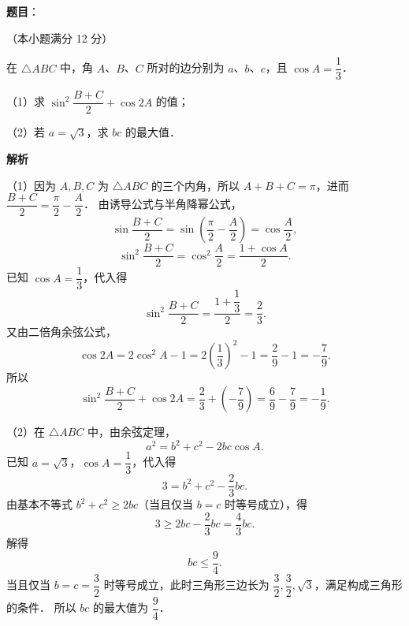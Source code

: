 \begin{answer}

\textbf{题目}：

（本小题满分 12 分）

在 $\triangle ABC$ 中，角 $A$、$B$、$C$ 所对的边分别为 $a$、$b$、$c$，且 $\cos A = \dfrac{1}{3}$．

（1）求 $\sin^2\dfrac{B+C}{2} + \cos 2A$ 的值；

（2）若 $a = \sqrt{3}$，求 $bc$ 的最大值．

\textbf{解析}

（1）因为 $A, B, C$ 为 $\triangle ABC$ 的三个内角，所以 $A + B + C = \pi$，进而 $\dfrac{B+C}{2} = \dfrac{\pi}{2} - \dfrac{A}{2}$．
由诱导公式与半角降幂公式，
\nopagebreak[4]
\[
\sin\frac{B+C}{2} = \sin\left(\frac{\pi}{2} - \frac{A}{2}\right) = \cos\frac{A}{2},
\]
\nopagebreak[4]
\[
\sin^2\frac{B+C}{2} = \cos^2\frac{A}{2} = \frac{1 + \cos A}{2}.
\]
已知 $\cos A = \dfrac{1}{3}$，代入得
\nopagebreak[4]
\[
\sin^2\frac{B+C}{2} = \frac{1 + \dfrac{1}{3}}{2} = \frac{2}{3}.
\]
又由二倍角余弦公式，
\nopagebreak[4]
\[
\cos 2A = 2\cos^2 A - 1 = 2\left(\frac{1}{3}\right)^2 - 1 = \frac{2}{9} - 1 = -\frac{7}{9}.
\]
所以
\nopagebreak[4]
\[
\sin^2\frac{B+C}{2} + \cos 2A = \frac{2}{3} + \left(-\frac{7}{9}\right) = \frac{6}{9} - \frac{7}{9} = -\frac{1}{9}.
\]

（2）在 $\triangle ABC$ 中，由余弦定理，
\nopagebreak[4]
\[
a^2 = b^2 + c^2 - 2bc\cos A.
\]
已知 $a = \sqrt{3}$，$\cos A = \dfrac{1}{3}$，代入得
\nopagebreak[4]
\[
3 = b^2 + c^2 - \frac{2}{3}bc.
\]
由基本不等式 $b^2 + c^2 \geqslant 2bc$（当且仅当 $b = c$ 时等号成立），得
\nopagebreak[4]
\[
3 \geqslant 2bc - \frac{2}{3}bc = \frac{4}{3}bc.
\]
解得
\nopagebreak[4]
\[
bc \leqslant \frac{9}{4}.
\]
当且仅当 $b = c = \dfrac{3}{2}$ 时等号成立，此时三角形三边长为 $\dfrac{3}{2}, \dfrac{3}{2}, \sqrt{3}$，满足构成三角形的条件．
所以 $bc$ 的最大值为 $\dfrac{9}{4}$．


\end{answer}
